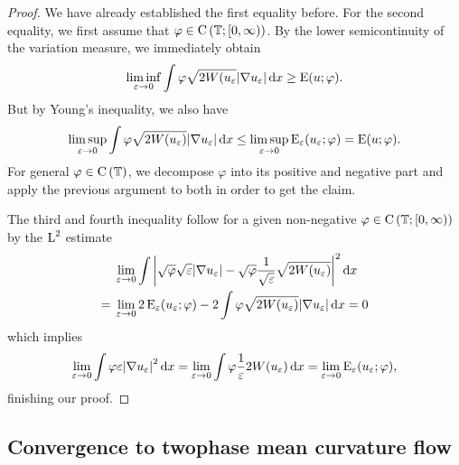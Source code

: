 \begin{proof}
	We have already established the first equality before. For the second equality, we first assume that $ \varphi \in \operatorname{C} \left( \operatorname{\mathbb{T}} ; [ 0 , \infty ) \right)$.
	By the lower semicontinuity of the variation measure, we immediately obtain
	\begin{equation*}
		\liminf_{ \varepsilon \to 0 }
			\int
				\varphi
				\sqrt{ 2 W ( u_{ \varepsilon } }
				\abs{ \nabla u_{ \varepsilon } }
			\dd{ x }
		\geq
		\operatorname{E} ( u ; \varphi ).
	\end{equation*}
	But by Young's inequality, we also have 
	\begin{equation*}
		\limsup_{ \varepsilon \to 0 }
			\int
				\varphi
				\sqrt{ 2 W ( u_{ \varepsilon } ) }
				\abs{ \nabla u_{ \varepsilon } }
			\dd{ x }
		\leq
		\limsup_{ \varepsilon \to 0 }
			\operatorname{E}_{ \varepsilon } ( u_{ \varepsilon } ; \varphi )
		= \operatorname{E} ( u ; \varphi ).
	\end{equation*}
	For general $ \varphi \in \operatorname{C} \left( \operatorname{\mathbb{T}} \right) $, we decompose $ \varphi $ into its positive and negative part and apply the previous argument to both in order to get the claim.
	
	The third and fourth inequality follow for a given non-negative $ \varphi \in \operatorname{C} \left( \operatorname{\mathbb{T}} ; [ 0 , \infty ) \right) $ by the $ \operatorname{L}^{ 2 } $ estimate
	\begin{align*}
		& \lim_{ \varepsilon \to 0 }
			\int
				\abs{ \sqrt{ \varphi } \sqrt{ \varepsilon } \abs{ \nabla u_{ \varepsilon } } - \sqrt{ \varphi } \frac{ 1 }{ \sqrt{ \varepsilon } } \sqrt{ 2 W ( u_{ \varepsilon } ) } }^{ 2 }
			\dd{ x }
		\\
		={} &
		\lim_{ \varepsilon \to 0 }
			2 \operatorname{E}_{ \varepsilon } ( u_{ \varepsilon } ; \varphi )
			-
			2 \int	
				\varphi
				\sqrt{ 2 W ( u_{ \varepsilon } ) }
				\abs{ \nabla u_{ \varepsilon } }
			\dd{ x }
		=
		0
	\end{align*}
	which implies
	\begin{equation*}
		\lim_{ \varepsilon \to 0 }
			\int
				\varphi
				\varepsilon
				\abs{ \nabla u_{ \varepsilon } }^{ 2 }
			\dd{ x }
		=
		\lim_{ \varepsilon \to 0}
			\int
				\varphi
				\frac{ 1 }{ \varepsilon }
				2 W ( u_{ \varepsilon } )
			\dd{ x }
		=
		\lim_{ \varepsilon \to 0 }
		\operatorname{E}_{ \varepsilon } ( u_{ \varepsilon } ; \varphi ),
	\end{equation*}
	finishing our proof.
\end{proof}

\subsection{Convergence to twophase mean curvature flow}

